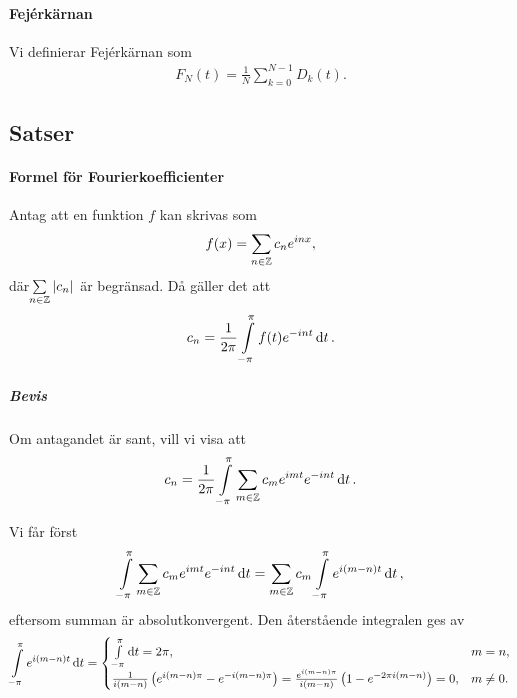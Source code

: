 \paragraph{Fejérkärnan}
Vi definierar Fejérkärnan som
\begin{align*}
	F_{N}(t) = \frac{1}{N}\sum\limits_{k = 0}^{N - 1}D_{k}(t).
\end{align*}

\subsection{Satser}

\paragraph{Formel för Fourierkoefficienter}
Antag att en funktion $f$ kan skrivas som
\begin{align*}
	f(x) = \sum\limits_{n\in\mathbb{Z}}c_{n}e^{inx},
\end{align*}
där$\sum\limits_{n\in\mathbb{Z}}\abs{c_{n}}$ är begränsad. Då gäller det att
\begin{align*}
	c_{n} = \frac{1}{2\pi}\int\limits_{-\pi}^{\pi}f(t)e^{-int}\dd{t}.
\end{align*}

\subparagraph{Bevis}
Om antagandet är sant, vill vi visa att
\begin{align*}
	c_{n} = \frac{1}{2\pi}\int\limits_{-\pi}^{\pi}\sum\limits_{m\in\mathbb{Z}}c_{m}e^{imt}e^{-int}\dd{t}.
\end{align*}

Vi får först
\begin{align*}
	\int\limits_{-\pi}^{\pi}\sum\limits_{m\in\mathbb{Z}}c_{m}e^{imt}e^{-int}\dd{t} = \sum\limits_{m\in\mathbb{Z}}c_{m}\int\limits_{-\pi}^{\pi}e^{i(m - n)t}\dd{t},
\end{align*}
eftersom summan är absolutkonvergent. Den återstående integralen ges av
\begin{align*}
	\int\limits_{-\pi}^{\pi}e^{i(m - n)t}\dd{t} =
	\begin{cases}
		\int\limits_{-\pi}^{\pi}\dd{t} = 2\pi,                                       &m = n, \\
		\frac{1}{i(m - n)}\left(e^{i(m - n)\pi} - e^{-i(m - n)\pi}\right) = \frac{e^{i(m - n)\pi}}{i(m - n)}\left(1 - e^{-2\pi i(m - n)}\right) = 0, &m\neq 0.
	\end{cases}
\end{align*}

